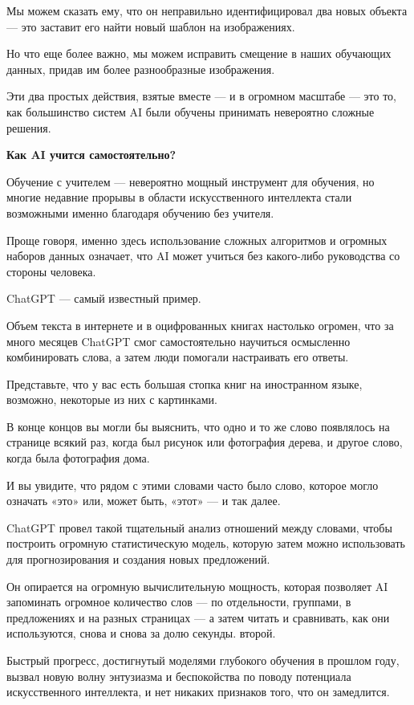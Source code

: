 Мы можем сказать ему, что он неправильно идентифицировал два новых объекта — это заставит его найти новый шаблон на изображениях.

Но что еще более важно, мы можем исправить смещение в наших обучающих данных, придав им более разнообразные изображения.

Эти два простых действия, взятые вместе — и в огромном масштабе — это то, как большинство систем AI были обучены принимать невероятно сложные решения.

\textbf{Как AI учится самостоятельно?}

Обучение с учителем — невероятно мощный инструмент для обучения, но многие недавние прорывы в области искусственного интеллекта стали возможными именно благодаря обучению без учителя.

Проще говоря, именно здесь использование сложных алгоритмов и огромных наборов данных означает, что AI может учиться без какого-либо руководства со стороны человека.

ChatGPT — самый известный пример.

Объем текста в интернете и в оцифрованных книгах настолько огромен, что за много месяцев ChatGPT смог самостоятельно научиться осмысленно комбинировать слова, а затем люди помогали настраивать его ответы.

Представьте, что у вас есть большая стопка книг на иностранном языке, возможно, некоторые из них с картинками.

В конце концов вы могли бы выяснить, что одно и то же слово появлялось на странице всякий раз, когда был рисунок или фотография дерева, и другое слово, когда была фотография дома.

И вы увидите, что рядом с этими словами часто было слово, которое могло означать «это» или, может быть, «этот» — и так далее.

ChatGPT провел такой тщательный анализ отношений между словами, чтобы построить огромную статистическую модель, которую затем можно использовать для прогнозирования и создания новых предложений.

Он опирается на огромную вычислительную мощность, которая позволяет AI запоминать огромное количество слов — по отдельности, группами, в предложениях и на разных страницах — а затем читать и сравнивать, как они используются, снова и снова за долю секунды. второй.

Быстрый прогресс, достигнутый моделями глубокого обучения в прошлом году, вызвал новую волну энтузиазма и беспокойства по поводу потенциала искусственного интеллекта, и нет никаких признаков того, что он замедлится.


